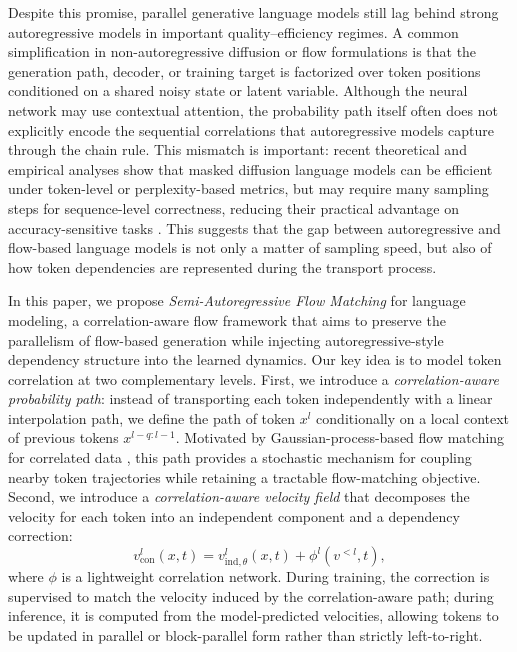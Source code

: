 \documentclass{article} %
\begin{document}
Despite this promise, parallel generative language models still lag behind strong autoregressive models in important quality--efficiency regimes. 
A common simplification in non-autoregressive diffusion or flow formulations is that the generation path, decoder, or training target is factorized over token positions conditioned on a shared noisy state or latent variable. 
Although the neural network may use contextual attention, the probability path itself often does not explicitly encode the sequential correlations that autoregressive models capture through the chain rule. 
This mismatch is important: recent theoretical and empirical analyses show that masked diffusion language models can be efficient under token-level or perplexity-based metrics, but may require many sampling steps for sequence-level correctness, reducing their practical advantage on accuracy-sensitive tasks \citep{feng2025theoretical}. 
This suggests that the gap between autoregressive and flow-based language models is not only a matter of sampling speed, but also of how token dependencies are represented during the transport process.

In this paper, we propose \emph{Semi-Autoregressive Flow Matching} for language modeling, a correlation-aware flow framework that aims to preserve the parallelism of flow-based generation while injecting autoregressive-style dependency structure into the learned dynamics. 
Our key idea is to model token correlation at two complementary levels. 
First, we introduce a \emph{correlation-aware probability path}: instead of transporting each token independently with a linear interpolation path, we define the path of token $x^l$ conditionally on a local context of previous tokens $x^{l-q:l-1}$. 
Motivated by Gaussian-process-based flow matching for correlated data \citep{wei2025streamlevel,kollovieh2025tsflow}, this path provides a stochastic mechanism for coupling nearby token trajectories while retaining a tractable flow-matching objective. 
Second, we introduce a \emph{correlation-aware velocity field} that decomposes the velocity for each token into an independent component and a dependency correction:
\begin{equation}
    v^l_{\mathrm{con}}(x,t)
    =
    v^l_{\mathrm{ind},\theta}(x,t)
    +
    \phi^l\!\left(v^{<l},t\right),
\end{equation}
where $\phi$ is a lightweight correlation network. 
During training, the correction is supervised to match the velocity induced by the correlation-aware path; during inference, it is computed from the model-predicted velocities, allowing tokens to be updated in parallel or block-parallel form rather than strictly left-to-right.
\end{document}
